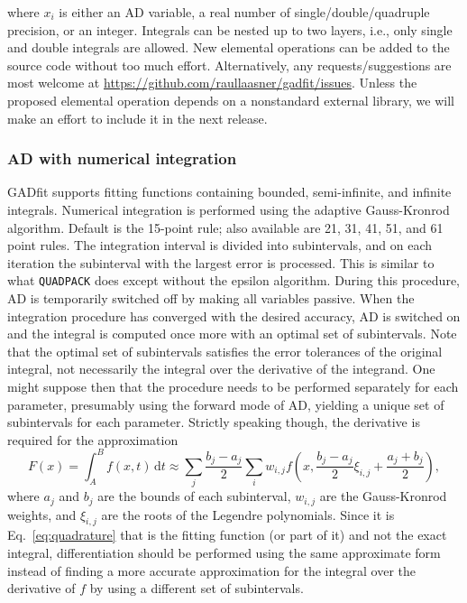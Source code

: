 \documentclass{article}
\newcommand{\D}{\,\textrm{d}}
\begin{document}
where $x_i$ is either an AD variable, a real number of single/double/quadruple precision, or an integer. Integrals can be nested up to two layers, i.e., only single and double integrals are allowed. New elemental operations can be added to the source code without too much effort. Alternatively, any requests/suggestions are most welcome at \url{https://github.com/raullaasner/gadfit/issues}. Unless the proposed elemental operation depends on a nonstandard external library, we will make an effort to include it in the next release.

\subsubsection{AD with numerical integration}

GADfit supports fitting functions containing bounded, semi-infinite, and infinite integrals. Numerical integration is performed using the adaptive Gauss-Kronrod algorithm. Default is the 15-point rule; also available are 21, 31, 41, 51, and 61 point rules. The integration interval is divided into subintervals, and on each iteration the subinterval with the largest error is processed. This is similar to what \texttt{QUADPACK} does except without the epsilon algorithm. During this procedure, AD is temporarily switched off by making all variables passive. When the integration procedure has converged with the desired accuracy, AD is switched on and the integral is computed once more with an optimal set of subintervals. Note that the optimal set of subintervals satisfies the error tolerances of the original integral, not necessarily the integral over the derivative of the integrand. One might suppose then that the procedure needs to be performed separately for each parameter, presumably using the forward mode of AD, yielding a unique set of subintervals for each parameter. Strictly speaking though, the derivative is required for the approximation
\begin{equation}
  \label{eq:quadrature}
  F(x) = \int_A^B f(x,t) \D t \approx \sum_j \frac{b_j-a_j}{2}\sum_i
  w_{i,j} f \left( x, \frac{b_j-a_j}{2}\xi_{i,j} + \frac{a_j+b_j}{2}
  \right),
\end{equation}
where $a_j$ and $b_j$ are the bounds of each subinterval, $w_{i,j}$ are the Gauss-Kronrod weights, and $\xi_{i,j}$ are the roots of the Legendre polynomials. Since it is Eq.~\eqref{eq:quadrature} that is the fitting function (or part of it) and not the exact integral, differentiation should be performed using the same approximate form instead of finding a more accurate approximation for the integral over the derivative of $f$ by using a different set of subintervals.
\end{document}
